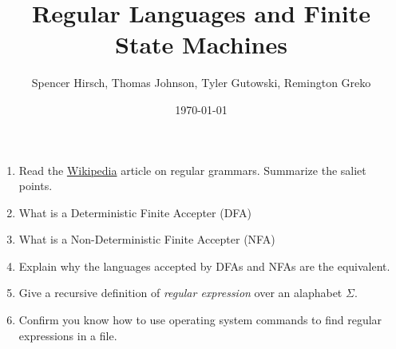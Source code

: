 \documentclass{article}
\begin{document}
\title{Regular Languages and Finite State Machines}
\author{Spencer Hirsch, Thomas Johnson, Tyler Gutowski, Remington Greko}
\date{\today}

\maketitle

\begin{enumerate}
    \item Read the \href{https://en.wikipedia.org/wiki/Regular_grammar}{Wikipedia} article on regular grammars. Summarize
            the saliet points.

    \medskip

    \item What is a Deterministic Finite Accepter (DFA)
    
    \medskip

    \item What is a Non-Deterministic Finite Accepter (NFA)
    
    \medskip

    \item Explain why the languages accepted by DFAs and NFAs are the equivalent.
    
    \medskip

    \item Give a recursive definition of \textit{regular expression} over
            an alaphabet $\Sigma$.

    \medskip

    \item Confirm you know how to use operating system commands to find
            regular expressions in a file.

    \medskip
\end{enumerate}
\end{document}
